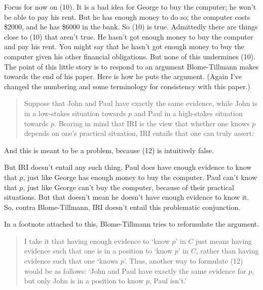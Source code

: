 \noindent Focus for now on (10). It is a bad idea for George to buy the computer; he won't be able to pay his rent. But he has enough money to do so; the computer costs \$2000, and he has \$6000 in the bank. So (10) is true. Admittedly there are things close to (10) that aren't true. He hasn't got enough money to buy the computer and pay his rent. You might say that he hasn't got enough money to buy the computer given his other financial obligations. But none of this undermines (10). The point of this little story is to respond to an argument Blome-Tillmann makes towards the end of his paper. Here is how he puts the argument. (Again I've changed the numbering and some terminology for consistency with this paper.)

\begin{quote}
\noindent Suppose that John and Paul have exactly the same evidence, while John is in a low-stakes situation towards $p$ and Paul in a high-stakes situation towards $p$. Bearing in mind that IRI is the view that whether one knows $p$ depends on one's practical situation, IRI entails that one can truly assert:

\end{quote}

\noindent And this is meant to be a problem, because (12) is intuitively false.

But IRI doesn't entail any such thing. Paul does have enough evidence to know that $p$, just like George has enough money to buy the computer. Paul can't know that $p$, just like George can't buy the computer, because of their practical situations. But that doesn't mean he doesn't have enough evidence to know it. So, contra Blome-Tillmann, IRI doesn't entail this problematic conjunction.

In a footnote attached to this, Blome-Tillmann tries to reformulate the argument.

\begin{quote}
\noindent I take it that having enough evidence to `know $p$' in $C$ just means having evidence such that one is in a position to `know $p$' in $C$, rather than having evidence such that one `knows $p$'. Thus, another way to formulate (12) would be as follows: `John and Paul have exactly the same evidence for $p$, but only John is in a position to know $p$, Paul isn't.'
\end{quote}

